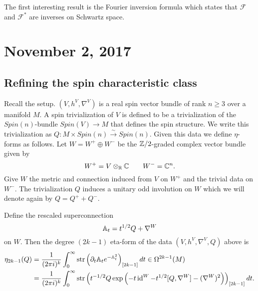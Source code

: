 \documentclass{amsart}
\begin{document}
The first interesting result is the Fourier inversion formula which states
that $\mathcal{F}$ and $\mathcal{F}^*$ are inverses on Schwartz space.



\section{November 2, 2017}

\subsection{Refining the spin characteristic class}




Recall the setup. $(V, h^V, \nabla^V)$ is a real spin vector bundle of rank $n\geq 3$
over a manifold $M$. A spin trivialization of $V$ is defined to be a trivialization
of the $Spin(n)$-bundle $Spin(V)\to M$ that defines the spin structure. We write
this trivialization as $Q:M\times Spin(n)\xrightarrow{\sim}Spin(n)$. Given this data
we define $\eta$-forms as follows. Let $W=W^+\oplus W^-$ be the $\mathbb{Z}/2$-graded complex
vector bundle given by
\begin{equation*}
    W^+ = V\otimes_{\mathbb{R}}\mathbb{C} \qquad W^- = \mathbb{C}^n.
\end{equation*}
Give $W$ the metric and connection induced from $V$ on $W^+$ and the trivial data on
$W^-$. The trivialization $Q$ induces a unitary odd involution on $W$ which we will
denote again by $Q=Q^++Q^-$.
\begin{definition}
    Define the rescaled superconnection
    \begin{equation*}
        \mathbb{A}_t = t^{1/2}Q + \nabla^W
    \end{equation*}
    on $W$. Then the degree $(2k-1)$ eta-form of the data $(V,h^V,\nabla^V,Q)$ above is
    \begin{align*}
        \eta_{2k-1}(Q) &= \frac{1}{(2\pi i)^k}\int_0^\infty \operatorname{str}\left( \partial_t\mathbb{A}_te^{-\mathbb{A}_t^2} \right)_{[2k-1]} dt \in \Omega^{2k-1}(M) \\
        &= \frac{1}{(2\pi i)^k}\int_0^\infty \operatorname{str}\left( t^{-1/2}Q\exp\left( -t\operatorname{id}^W-t^{1/2}[Q,\nabla^W]-(\nabla^W)^2 \right) \right)_{[2k-1]}dt.
    \end{align*}
\end{definition}
\end{document}

